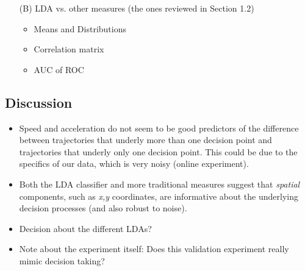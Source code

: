 \documentclass{article}
\begin{document}
\begin{itemize}
\item[(B)] LDA vs. other measures (the ones reviewed in Section 1.2)

\begin{itemize}
\item Means and Distributions
\item Correlation matrix
\item AUC of ROC
\end{itemize}
\end{itemize}




\subsection{Discussion}

\begin{itemize}
\item Speed and acceleration do not seem to be good predictors of the difference between trajectories that underly more than one decision point and trajectories that underly only one decision point. This could be due to the specifics of our data, which is very noisy (online experiment).

\item Both the LDA classifier and more traditional measures suggest that \emph{spatial} components, such as \textit{x,y} coordinates, are informative about the underlying decision processes (and also robust to noise). 

\item Decision about the different LDAs?

\item Note about the experiment itself: Does this validation experiment really mimic decision taking? 

\end{itemize}
\end{document}
